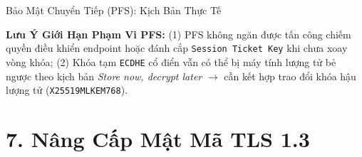 \documentclass[aspectratio=169, 10pt]{beamer}
\begin{document}
\begin{frame}{Bảo Mật Chuyển Tiếp (PFS): Kịch Bản Thực Tế}
	\begin{uetcard}[colback=uetaccentbg, top=2.5pt, bottom=2.5pt, left=6pt, right=6pt, sharp corners, arc=0pt]
		\raggedright\fontsize{6.1pt}{7.6pt}\selectfont
		{\color{uetblue}\textbf{Lưu Ý Giới Hạn Phạm Vi PFS:}} (1) PFS không ngăn được tấn công chiếm quyền điều khiển endpoint hoặc đánh cắp \texttt{Session Ticket Key} khi chưa xoay vòng khóa; (2) Khóa tạm \texttt{ECDHE} cổ điển vẫn có thể bị máy tính lượng tử bẻ ngược theo kịch bản \textit{Store now, decrypt later} $\rightarrow$ cần kết hợp trao đổi khóa hậu lượng tử (\texttt{X25519MLKEM768}).
	\end{uetcard}
\end{frame}

\section{7. Nâng Cấp Mật Mã TLS 1.3}
\end{document}
